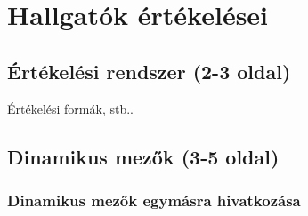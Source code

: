 \chapter{Hallgatók értékelései}\label{chapter:assessments}

\section{Értékelési rendszer (2-3 oldal)}
Értékelési formák, stb..

\section{Dinamikus mezők (3-5 oldal)}

\subsection{Dinamikus mezők egymásra hivatkozása}